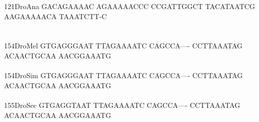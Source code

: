 \documentclass[11pt,twoside,reqno,a4paper]{article}
\begin{document}
{121\hspace*{1\charwidth}DroAna	GACAGAAAAC	AGAAAAACCC	CCGATTGGCT	TACATAATCG	AAGAAAAACA	TAAATCTT-C	\\
\hspace*{4\charwidth}\hspace*{7\charwidth}\hspace*{1\charwidth}\hspace*{1\charwidth}\hspace*{1\charwidth}\hspace*{1\charwidth}\hspace*{1\charwidth}\hspace*{1\charwidth}\\
\\
154\hspace*{1\charwidth}DroMel	GTGAGGGAAT	TTAGAAAATC	CAGCCA----	CCTTAAATAG	ACAACTGCAA	AACGGAAATG	\\
\hspace*{4\charwidth}\hspace*{7\charwidth}\hspace*{1\charwidth}\hspace*{1\charwidth}\hspace*{1\charwidth}\hspace*{1\charwidth}\hspace*{1\charwidth}\hspace*{1\charwidth}\\
154\hspace*{1\charwidth}DroSim	GTGAGGGAAT	TTAGAAAATC	CAGCCA----	CCTTAAATAG	ACAACTGCAA	AACGGAAATG	\\
\hspace*{4\charwidth}\hspace*{7\charwidth}\hspace*{1\charwidth}\hspace*{1\charwidth}\hspace*{1\charwidth}\hspace*{1\charwidth}\hspace*{1\charwidth}\hspace*{1\charwidth}\\
155\hspace*{1\charwidth}DroSec	GTGAGGTAAT	TTAGAAAATC	CAGCCA----	CCTTAAATAG	ACAACTGCAA	AACGGAAATG	\\
\hspace*{4\charwidth}\hspace*{7\charwidth}\hspace*{1\charwidth}\hspace*{1\charwidth}\hspace*{1\charwidth}\hspace*{1\charwidth}\hspace*{1\charwidth}\hspace*{1\charwidth}\\
}
\end{document}
